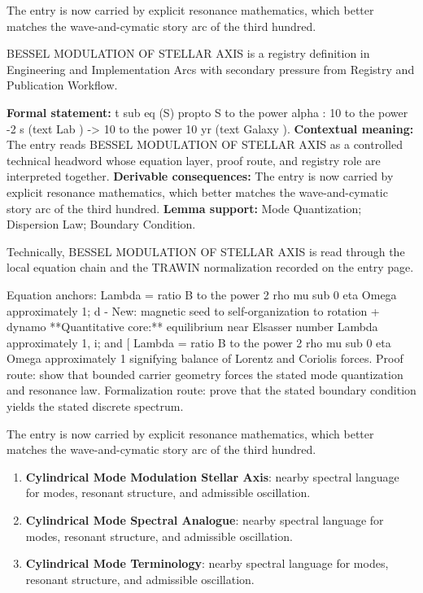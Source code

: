 The entry is now carried by explicit resonance mathematics, which better matches the wave-and-cymatic story arc of the third hundred.
\clearpage


\begingroup\small
{}
BESSEL MODULATION OF STELLAR AXIS is a registry definition in Engineering and Implementation Arcs with secondary pressure from Registry and Publication Workflow.

\begingroup\footnotesize\setlength{\emergencystretch}{3em}\sloppy
\textbf{Formal statement:} t sub eq (S) propto S to the power alpha : 10 to the power -2 s (text Lab ) -> 10 to the power 10 yr (text Galaxy ). \textbf{Contextual meaning:} The entry reads BESSEL MODULATION OF STELLAR AXIS as a controlled technical headword whose equation layer, proof route, and registry role are interpreted together. \textbf{Derivable consequences:} The entry is now carried by explicit resonance mathematics, which better matches the wave-and-cymatic story arc of the third hundred. \textbf{Lemma support:} Mode Quantization; Dispersion Law; Boundary Condition.\par
\endgroup

Technically, BESSEL MODULATION OF STELLAR AXIS is read through the local equation chain and the TRAWIN normalization recorded on the entry page.

Equation anchors: Lambda = ratio B to the power 2 rho mu sub 0 eta Omega approximately 1; d - New: magnetic seed to self-organization to rotation + dynamo **Quantitative core:** equilibrium near Elsasser number Lambda approximately 1, i; and [ Lambda = ratio B to the power 2 rho mu sub 0 eta Omega approximately 1 signifying balance of Lorentz and Coriolis forces. Proof route: show that bounded carrier geometry forces the stated mode quantization and resonance law. Formalization route: prove that the stated boundary condition yields the stated discrete spectrum.

The entry is now carried by explicit resonance mathematics, which better matches the wave-and-cymatic story arc of the third hundred.
\endgroup

\begin{enumerate}[leftmargin=1.6em,itemsep=6pt,topsep=4pt]
\item \textbf{Cylindrical Mode Modulation Stellar Axis}: nearby spectral language for modes, resonant structure, and admissible oscillation.
\item \textbf{Cylindrical Mode Spectral Analogue}: nearby spectral language for modes, resonant structure, and admissible oscillation.
\item \textbf{Cylindrical Mode Terminology}: nearby spectral language for modes, resonant structure, and admissible oscillation.
\end{enumerate}

